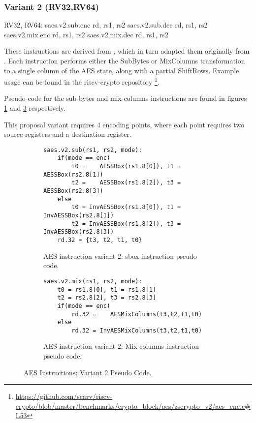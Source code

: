 \newpage
\subsubsection{Variant 2 (RV32,RV64)}

\begin{cryptoisa}
RV32, RV64:
    saes.v2.sub.enc    rd, rs1, rs2
    saes.v2.sub.dec    rd, rs1, rs2
    saes.v2.mix.enc    rd, rs1, rs2
    saes.v2.mix.dec    rd, rs1, rs2
\end{cryptoisa}

These instructions are derived from \cite{MPP:19}, which in turn adapted
them originally from \cite{TG:06}.
Each instruction performs either the SubBytes or MixColumns transformation
to a single column of the AES state, along with a partial ShiftRows.
Example usage can be found in the riscv-crypto repository
\footnote{\url{https://github.com/scarv/riscv-crypto/blob/master/benchmarks/crypto_block/aes/zscrypto_v2/aes_enc.c\#L53}}.

Pseudo-code for the sub-bytes and mix-columns instructions are found in
figures
\ref{fig:pesudo:aes:v2:sub}
and
\ref{fig:pesudo:aes:v2:mix}
respectively.

This proposal variant requires $4$ encoding points, where each point
requires two source registers and a destination register.

\begin{figure}
\begin{subfigure}[b]{1.0\textwidth}
\begin{lstlisting}[language=pseudo]
saes.v2.sub(rs1, rs2, mode):
    if(mode == enc)
        t0 =    AESSBox(rs1.8[0]), t1 =    AESSBox(rs2.8[1])
        t2 =    AESSBox(rs1.8[2]), t3 =    AESSBox(rs2.8[3])
    else
        t0 = InvAESSBox(rs1.8[0]), t1 = InvAESSBox(rs2.8[1])
        t2 = InvAESSBox(rs1.8[2]), t3 = InvAESSBox(rs2.8[3])
    rd.32 = {t3, t2, t1, t0} 
\end{lstlisting}
\caption{AES instruction variant 2: sbox instruction pseudo code.}
\label{fig:pesudo:aes:v2:sub}
\end{subfigure}
\begin{subfigure}[b]{1.0\textwidth}
\begin{lstlisting}[language=pseudo]
saes.v2.mix(rs1, rs2, mode):
    t0 = rs1.8[0], t1 = rs1.8[1]
    t2 = rs2.8[2], t3 = rs2.8[3]
    if(mode == enc)
        rd.32 =    AESMixColumns(t3,t2,t1,t0)
    else
        rd.32 = InvAESMixColumns(t3,t2,t1,t0)
\end{lstlisting}
\caption{AES instruction variant 2: Mix columns instruction pseudo code.}
\label{fig:pesudo:aes:v2:mix}
\end{subfigure}
\caption{AES Instructions: Variant 2 Pseudo Code.}
\end{figure}

